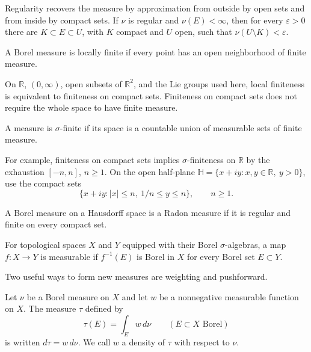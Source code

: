 Regularity recovers the measure by approximation from outside by open sets and from inside by compact sets. If $\nu$ is regular and $\nu(E)<\infty$, then for every $\varepsilon>0$ there are $K\subset E\subset U$, with $K$ compact and $U$ open, such that $\nu(U\setminus K)<\varepsilon$.

\begin{definition}\label{measure.locally-finite}
A Borel measure is locally finite if every point has an open neighborhood of finite measure.
\end{definition}

On $\mathbb R$, $(0,\infty)$, open subsets of $\mathbb R^2$, and the Lie groups used here, local finiteness is equivalent to finiteness on compact sets. Finiteness on compact sets does not require the whole space to have finite measure.

\begin{definition}\label{measure.sigma-finite}
A measure is $\sigma$-finite if its space is a countable union of measurable sets of finite measure.
\end{definition}

For example, finiteness on compact sets implies $\sigma$-finiteness on $\mathbb R$ by the exhaustion $[-n,n]$, $n\geq1$. On the open half-plane $\mathbb H=\{x+iy:x,y\in\mathbb R,\ y>0\}$, use the compact sets
\[
 \{x+iy:|x|\leq n,\ 1/n\leq y\leq n\},\qquad n\geq1.
\]

\begin{definition}\label{measure.radon}
A Borel measure on a Hausdorff space is a Radon measure if it is regular and finite on every compact set.
\end{definition}

\begin{definition}\label{measure.measurable-map}
For topological spaces $X$ and $Y$ equipped with their Borel $\sigma$-algebras, a map $f:X\to Y$ is measurable if $f^{-1}(E)$ is Borel in $X$ for every Borel set $E\subset Y$.
\end{definition}

\label{measure.density-pushforward}
Two useful ways to form new measures are weighting and pushforward.

\begin{definition}\label{measure.density}
Let $\nu$ be a Borel measure on $X$ and let $w$ be a nonnegative measurable function on $X$. The measure $\tau$ defined by
\[
 \tau(E)=\int_E w\,d\nu
 \qquad(E\subset X\text{ Borel})
\]
is written $d\tau=w\,d\nu$. We call $w$ a density of $\tau$ with respect to $\nu$.
\end{definition}

